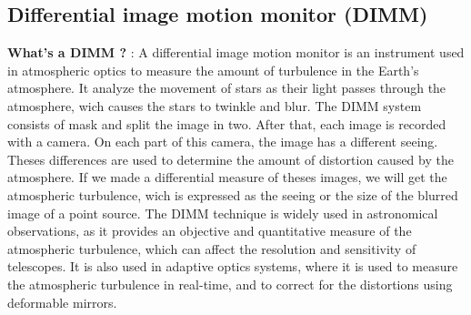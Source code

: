 \subsection{Differential image motion monitor (DIMM)}\label{sec:Theo_DIMM}
\textbf{What's a \Gls{DIMM} ?} : \newline A differential image motion monitor is an instrument used in atmospheric optics to measure the amount of turbulence
in the Earth's atmosphere. It analyze the movement of stars as their light passes through the atmosphere, wich causes the stars to twinkle and blur.
\newline
The \Gls{DIMM} system consists of mask and split the image in two. After that, each image is recorded with a camera. On each part of this camera, the image
has a different seeing. Theses differences are used to determine the amount of distortion caused by the atmosphere.\newline
If we made a differential measure of theses images, we will get the atmospheric turbulence, wich is expressed as the seeing or the size of the
blurred image of a point source. \newline
The \Gls{DIMM} technique is widely used in astronomical observations, as it provides an objective and quantitative measure of the atmospheric turbulence,
which can affect the resolution and sensitivity of telescopes. It is also used in adaptive optics systems, where it is used to measure the atmospheric
turbulence in real-time, and to correct for the distortions using deformable mirrors.


